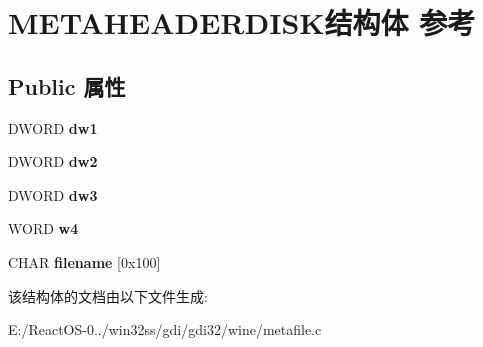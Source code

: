 \hypertarget{struct_m_e_t_a_h_e_a_d_e_r_d_i_s_k}{}\section{M\+E\+T\+A\+H\+E\+A\+D\+E\+R\+D\+I\+S\+K结构体 参考}
\label{struct_m_e_t_a_h_e_a_d_e_r_d_i_s_k}
\subsection*{Public 属性}
\begin{DoxyCompactItemize}
\item 
\mbox{\label{struct_m_e_t_a_h_e_a_d_e_r_d_i_s_k_ae596e37055d5a1abad20db665bc8f7b6}} 
D\+W\+O\+RD {\bfseries dw1}
\item 
\mbox{\label{struct_m_e_t_a_h_e_a_d_e_r_d_i_s_k_a9b5ff941ef12da16578da91af151df8c}} 
D\+W\+O\+RD {\bfseries dw2}
\item 
\mbox{\label{struct_m_e_t_a_h_e_a_d_e_r_d_i_s_k_af0d3127921492d928fe14fa37121c750}} 
D\+W\+O\+RD {\bfseries dw3}
\item 
\mbox{\label{struct_m_e_t_a_h_e_a_d_e_r_d_i_s_k_abddf53d00cafaa971ead77ed98edc831}} 
W\+O\+RD {\bfseries w4}
\item 
\mbox{\label{struct_m_e_t_a_h_e_a_d_e_r_d_i_s_k_a00178ef2dabf94cccae3037acbc1a7e9}} 
C\+H\+AR {\bfseries filename} \mbox{[}0x100\mbox{]}
\end{DoxyCompactItemize}


该结构体的文档由以下文件生成\+:\begin{DoxyCompactItemize}
\item 
E\+:/\+React\+O\+S-\/0../win32ss/gdi/gdi32/wine/metafile.\+c\end{DoxyCompactItemize}
